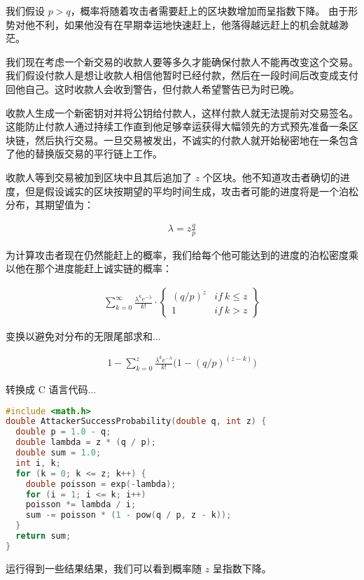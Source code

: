\documentclass{article}
\begin{document}
我们假设 $p > q$，概率将随着攻击者需要赶上的区块数增加而呈指数下降。 由于形势对他不利，如果他没有在早期幸运地快速赶上，他落得越远赶上的机会就越渺茫。

我们现在考虑一个新交易的收款人要等多久才能确保付款人不能再改变这个交易。我们假设付款人是想让收款人相信他暂时已经付款，然后在一段时间后改变成支付回他自己。这时收款人会收到警告，但付款人希望警告已为时已晚。

收款人生成一个新密钥对并将公钥给付款人，这样付款人就无法提前对交易签名。这能防止付款人通过持续工作直到他足够幸运获得大幅领先的方式预先准备一条区块链，然后执行交易。一旦交易被发出，不诚实的付款人就开始秘密地在一条包含了他的替换版交易的平行链上工作。

收款人等到交易被加到区块中且其后追加了 $z$ 个区块。他不知道攻击者确切的进度，但是假设诚实的区块按期望的平均时间生成，攻击者可能的进度将是一个泊松分布，其期望值为：

\begin{align*}
 \lambda = z\frac{q}{p}
\end{align*}

为计算攻击者现在仍然能赶上的概率，我们给每个他可能达到的进度的泊松密度乘以他在那个进度能赶上诚实链的概率：

\begin{align*}
 \sum_{k = 0}^{\infty}
 \frac{\lambda^ke^{-\lambda}}{k!}
 \cdot
 \begin{Bmatrix}
  (q / p)^z & if \ k \leq z \\
  1         & if \ k > z    
 \end{Bmatrix}
\end{align*}

变换以避免对分布的无限尾部求和...

\begin{align*}
 1-
 \sum_{k = 0}^{z}
 \frac{\lambda^ke^{-\lambda}}{k!}
 \big(1 - (q / p)^{(z - k)}\big)
\end{align*}

转换成 C 语言代码...

\begin{lstlisting}[language=C]
#include <math.h>
double AttackerSuccessProbability(double q, int z) {
  double p = 1.0 - q;
  double lambda = z * (q / p);
  double sum = 1.0;
  int i, k;
  for (k = 0; k <= z; k++) {
    double poisson = exp(-lambda);
    for (i = 1; i <= k; i++)
    poisson *= lambda / i;
    sum -= poisson * (1 - pow(q / p, z - k));
  }
  return sum;
}
\end{lstlisting}

运行得到一些结果结果，我们可以看到概率随 $z$ 呈指数下降。
\end{document}
